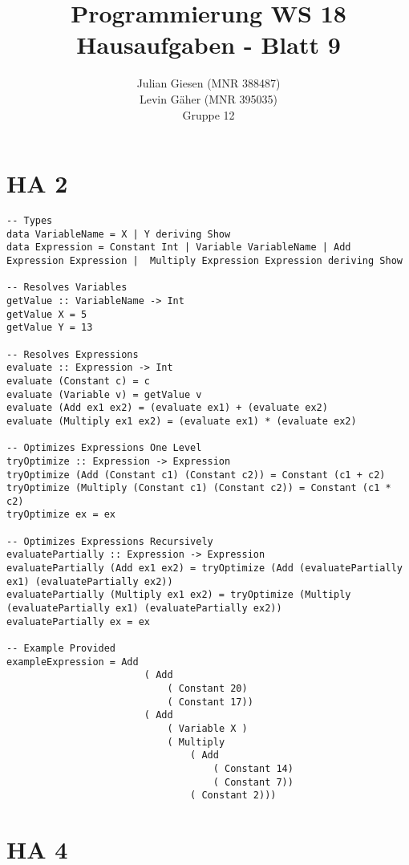 \documentclass[a4paper]{article}
\title{ Programmierung WS 18 \\ Hausaufgaben - Blatt 9 }
\author{ Julian Giesen (MNR 388487) \\
Levin Gäher (MNR 395035) \\
Gruppe 12 }
\date{  }
\begin{document}
\maketitle

\section*{HA 2 }

\begin{lstlisting}
-- Types
data VariableName = X | Y deriving Show
data Expression = Constant Int | Variable VariableName | Add Expression Expression |  Multiply Expression Expression deriving Show

-- Resolves Variables
getValue :: VariableName -> Int
getValue X = 5
getValue Y = 13

-- Resolves Expressions
evaluate :: Expression -> Int
evaluate (Constant c) = c
evaluate (Variable v) = getValue v
evaluate (Add ex1 ex2) = (evaluate ex1) + (evaluate ex2)
evaluate (Multiply ex1 ex2) = (evaluate ex1) * (evaluate ex2)

-- Optimizes Expressions One Level
tryOptimize :: Expression -> Expression
tryOptimize (Add (Constant c1) (Constant c2)) = Constant (c1 + c2)
tryOptimize (Multiply (Constant c1) (Constant c2)) = Constant (c1 * c2)
tryOptimize ex = ex

-- Optimizes Expressions Recursively
evaluatePartially :: Expression -> Expression
evaluatePartially (Add ex1 ex2) = tryOptimize (Add (evaluatePartially ex1) (evaluatePartially ex2))
evaluatePartially (Multiply ex1 ex2) = tryOptimize (Multiply (evaluatePartially ex1) (evaluatePartially ex2))
evaluatePartially ex = ex

-- Example Provided
exampleExpression = Add
						( Add
							( Constant 20)
							( Constant 17))
						( Add
							( Variable X )
							( Multiply
								( Add
									( Constant 14)
									( Constant 7))
								( Constant 2)))
\end{lstlisting}

\pagebreak

\section*{HA 4 }
\end{document}
